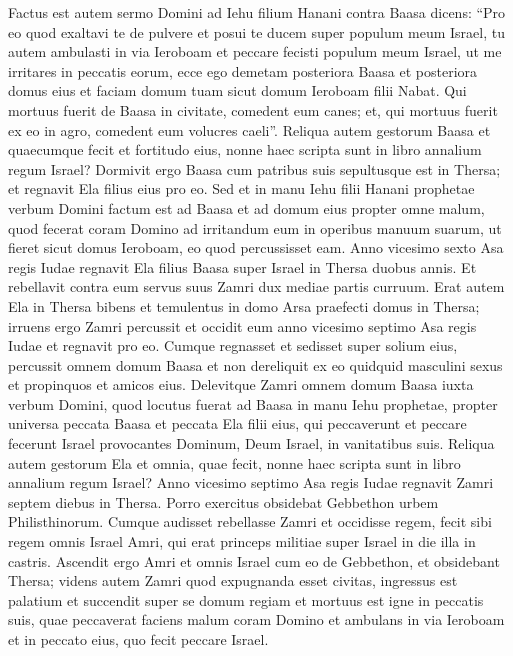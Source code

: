 \begin{biblechapter}  
\verse Factus est autem sermo Domini ad Iehu filium Hanani contra Baasa dicens: 
\verse “Pro eo quod exaltavi te de pulvere et posui te ducem super populum meum Israel, tu autem ambulasti in via Ieroboam et peccare fecisti populum meum Israel, ut me irritares in peccatis eorum, 
\verse ecce ego demetam posteriora Baasa et posteriora domus eius et faciam domum tuam sicut domum Ieroboam filii Nabat. 
\verse Qui mortuus fuerit de Baasa in civitate, comedent eum canes; et, qui mortuus fuerit ex eo in agro, comedent eum volucres caeli”. 
\verse Reliqua autem gestorum Baasa et quaecumque fecit et fortitudo eius, nonne haec scripta sunt in libro annalium regum Israel? 
\verse Dormivit ergo Baasa cum patribus suis sepultusque est in Thersa; et regnavit Ela filius eius pro eo. 
\verse Sed et in manu Iehu filii Hanani prophetae verbum Domini factum est ad Baasa et ad domum eius propter omne malum, quod fecerat coram Domino ad irritandum eum in operibus manuum suarum, ut fieret sicut domus Ieroboam, eo quod percussisset eam. 
\verse Anno vicesimo sexto Asa regis Iudae regnavit Ela filius Baasa super Israel in Thersa duobus annis. 
\verse Et rebellavit contra eum servus suus Zamri dux mediae partis curruum. Erat autem Ela in Thersa bibens et temulentus in domo Arsa praefecti domus in Thersa; 
\verse irruens ergo Zamri percussit et occidit eum anno vicesimo septimo Asa regis Iudae et regnavit pro eo. 
\verse Cumque regnasset et sedisset super solium eius, percussit omnem domum Baasa et non dereliquit ex eo quidquid masculini sexus et propinquos et amicos eius. 
\verse Delevitque Zamri omnem domum Baasa iuxta verbum Domini, quod locutus fuerat ad Baasa in manu Iehu prophetae, 
\verse propter universa peccata Baasa et peccata Ela filii eius, qui peccaverunt et peccare fecerunt Israel provocantes Dominum, Deum Israel, in vanitatibus suis. 
\verse Reliqua autem gestorum Ela et omnia, quae fecit, nonne haec scripta sunt in libro annalium regum Israel? 
\verse Anno vicesimo septimo Asa regis Iudae regnavit Zamri septem diebus in Thersa. Porro exercitus obsidebat Gebbethon urbem Philisthinorum. 
\verse Cumque audisset rebellasse Zamri et occidisse regem, fecit sibi regem omnis Israel Amri, qui erat princeps militiae super Israel in die illa in castris. 
\verse Ascendit ergo Amri et omnis Israel cum eo de Gebbethon, et obsidebant Thersa; 
\verse videns autem Zamri quod expugnanda esset civitas, ingressus est palatium et succendit super se domum regiam et mortuus est igne 
\verse in peccatis suis, quae peccaverat faciens malum coram Domino et ambulans in via Ieroboam et in peccato eius, quo fecit peccare Israel. 

\end{biblechapter}
